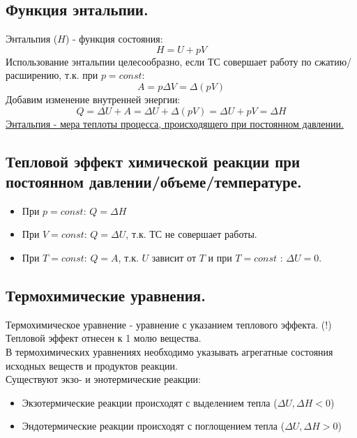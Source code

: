 \documentclass[14pt,a4paper]{scrartcl}
\begin{document}
		\subsection*{Функция энтальпии.} 	
		Энтальпия ($H$) - функция состояния:
		$$ H = U + pV $$
		Использование энтальпии целесообразно, если ТС совершает  работу по сжатию/расширению, т.к. при $p = const$:
		$$ A = p \Delta{V} = \Delta{(pV)}  $$ 
		Добавим изменение внутренней энергии:
		$$Q = \Delta{U} + A = \Delta{U} + \Delta{(pV)} = \Delta{U + pV} = \Delta{H} $$
		\underline{Энтальпия - мера теплоты процесса, происходящего при постоянном давлении.} 
		
		\subsection*{Тепловой эффект химической реакции при постоянном давлении/объеме/температуре.} 
		\begin{itemize}
			\item При $p = const$: $Q = \Delta{H}$
			\item При $V = const$: $Q = \Delta{U}$, т.к. ТС не совершает работы.
			\item При $T = const$: $Q = A$, т.к. $U$ зависит от $T$ и при $T=const$ : $\Delta{U} = 0$.
		\end{itemize}
	
		\subsection*{Термохимические уравнения.}
		Термохимическое уравнение - уравнение с указанием теплового эффекта. (!) Тепловой эффект отнесен к 1 молю вещества.\\
		В термохимических уравнениях необходимо указывать агрегатные состояния исходных веществ и продуктов реакции. \\
		Существуют экзо- и энотермические реакции:
		\begin{itemize}
			\item Экзотермические реакции происходят с выделением тепла ($\Delta{U}, \Delta{H} < 0$)
			\item Эндотермические реакции происходят с поглощением тепла ($\Delta{U}, \Delta{H} > 0$)
		\end{itemize}
\end{document}
